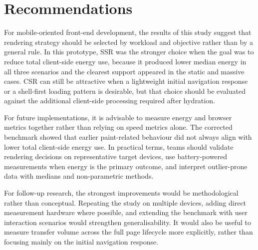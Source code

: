 \section{Recommendations}

For mobile-oriented front-end development, the results of this study suggest that rendering strategy should be selected by workload and objective rather than by a general rule. In this prototype, SSR was the stronger choice when the goal was to reduce total client-side energy use, because it produced lower median energy in all three scenarios and the clearest support appeared in the static and massive cases. CSR can still be attractive when a lightweight initial navigation response or a shell-first loading pattern is desirable, but that choice should be evaluated against the additional client-side processing required after hydration.

For future implementations, it is advisable to measure energy and browser metrics together rather than relying on speed metrics alone. The corrected benchmark showed that earlier paint-related behaviour did not always align with lower total client-side energy use. In practical terms, teams should validate rendering decisions on representative target devices, use battery-powered measurements when energy is the primary outcome, and interpret outlier-prone data with medians and non-parametric methods.

For follow-up research, the strongest improvements would be methodological rather than conceptual. Repeating the study on multiple devices, adding direct measurement hardware where possible, and extending the benchmark with user interaction scenarios would strengthen generalisability. It would also be useful to measure transfer volume across the full page lifecycle more explicitly, rather than focusing mainly on the initial navigation response.
